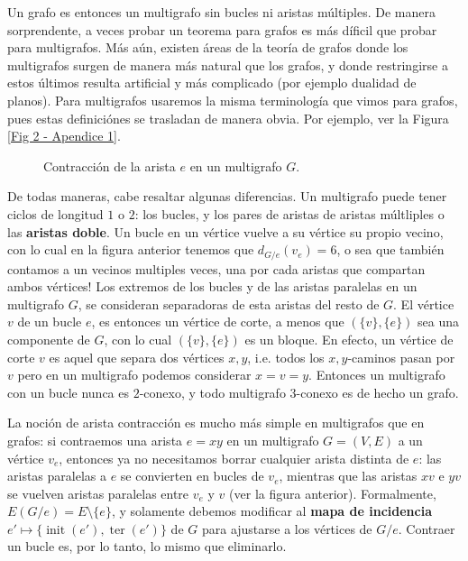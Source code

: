 \documentclass[../main.tex]{subfiles}
\begin{document}
Un grafo es entonces un multigrafo sin bucles ni aristas múltiples. De manera sorprendente, a veces probar un teorema
 para grafos es más díficil que probar para multigrafos. Más aún, existen áreas de la teoría de grafos donde los
 multigrafos surgen de manera más natural que los grafos, y donde restringirse a estos últimos resulta artificial y
 más complicado (por ejemplo dualidad de planos). Para multigrafos usaremos la misma terminología que vimos para
 grafos, pues estas definiciónes se trasladan de manera obvia. Por ejemplo, ver la Figura \ref{Fig 2 - Apendice 1}.

\begin{center}
\begin{figure}

\caption{Contracción de la arista $e$ en un multigrafo $G$.}
\end{figure}
\label{Fig 2 - Apendice 1}
\end{center}

De todas maneras, cabe resaltar algunas diferencias. Un multigrafo puede tener ciclos de longitud $1$ o $2$: los
bucles, y los pares de aristas de aristas múltliples o las \textbf{aristas doble}. Un bucle en un vértice vuelve a su
 vértice su propio vecino, con lo cual en la figura anterior tenemos que $d_{G/e} (v_e) = 6$, o sea que también
 contamos a un vecinos multiples veces, una por cada aristas que compartan ambos vértices! Los extremos de los bucles
  y de las aristas paralelas en un multigrafo $G$, se consideran separadoras de esta aristas del resto de $G$. El
  vértice $v$ de un bucle $e$, es entonces un vértice de corte, a menos que $(\{v\}, \{e\})$ sea una componente de $G$, con lo cual $(\{v\}, \{e\})$ es un bloque. En efecto, un vértice de corte $v$ es aquel que separa dos vértices $x,y$, i.e. todos los $x,y$-caminos pasan por $v$ pero en un multigrafo podemos considerar $x=v=y$. Entonces un multigrafo con un bucle nunca es $2$-conexo, y todo multigrafo $3$-conexo es de hecho un grafo.

La noción de arista contracción es mucho más simple en multigrafos que en grafos: si contraemos una arista $e = xy$
en un multigrafo $G=(V,E)$ a un vértice $v_e$, entonces ya no necesitamos borrar cualquier arista distinta de $e$:
las aristas paralelas a $e$ se convierten en bucles de $v_e$, mientras que las aristas $xv$ e $yv$ se vuelven aristas
 paralelas entre $v_e$ y $v$ (ver la figura anterior). Formalmente, $E(G/e) = E \setminus \{e\}$, y solamente debemos
  modificar al \textbf{mapa de incidencia} $e' \mapsto \{ \operatorname{init}(e'), \operatorname{ter}(e')\}$ de $G$
  para ajustarse a los vértices de $G/e$. Contraer un bucle es, por lo tanto, lo mismo que eliminarlo.
\end{document}
